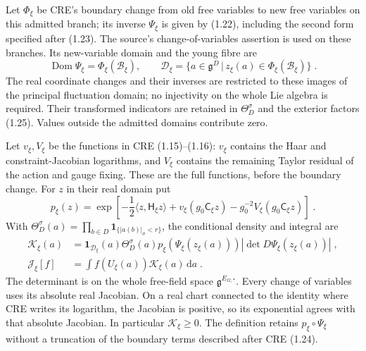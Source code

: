 \documentclass[11pt]{article}
\newcommand{\dd}{\mathrm{d}}
\begin{document}
Let $\Phi_\xi$ be CRE's boundary change from old free variables to new free variables on this admitted branch; its inverse $\Psi_\xi$ is given by (1.22), including the second form specified after (1.23). The source's change-of-variables assertion is used on these branches. Its new-variable domain and the young fibre are
\begin{equation}\label{eq:retained-change-domain}
    \operatorname{Dom}\Psi_\xi=\Phi_\xi(\mathcal B_\xi),
    \qquad \mathcal D_\xi=
        \bigl\{a\in\mathfrak g^D\, | \,z_\xi(a)\in\Phi_\xi(\mathcal B_\xi)\bigr\}\;.
\end{equation}
The real coordinate changes and their inverses are restricted to these images of the principal fluctuation domain; no injectivity on the whole Lie algebra is required. Their transformed indicators are retained in $\Theta_D^\sigma$ and the exterior factors (1.25). Values outside the admitted domains contribute zero.

Let $v_\xi,V_\xi$ be the functions in CRE (1.15)--(1.16): $v_\xi$ contains the Haar and constraint-Jacobian logarithms, and $V_\xi$ contains the remaining Taylor residual of the action and gauge fixing. These are the full functions, before the boundary change. For $z$ in their real domain put
\begin{equation}\label{eq:retained-prechange-density}
    p_\xi(z)=\exp\left[
        -\frac{1}{2}\langle z,\mathsf H_\xi z\rangle
        +v_\xi(g_0\mathsf C_\xi z)
        -g_0^{-2}V_\xi(g_0\mathsf C_\xi z)\right]\;.
\end{equation}
With $\Theta_D^\sigma(a)=\prod_{b\in D}\mathbf1_{\{|a(b)|_\sigma<r\}}$, the conditional density and integral are
\begin{equation}\label{eq:retained-positive-kernel}
    \begin{aligned}
        \mathcal K_\xi(a)&=
            \mathbf1_{\mathcal D_\xi}(a)\Theta_D^\sigma(a)
            p_\xi(\Psi_\xi(z_\xi(a)))
            |\det D\Psi_\xi(z_\xi(a))|\;,\\
        \mathcal J_\xi[f]&=\int
            f(U_\xi(a))\mathcal K_\xi(a)\,\dd a\;.
    \end{aligned}
\end{equation}
The determinant is on the whole free-field space $\mathfrak g^{E_{\Omega,*}}$. Every change of variables uses its absolute real Jacobian. On a real chart connected to the identity where CRE writes its logarithm, the Jacobian is positive, so its exponential agrees with that absolute Jacobian. In particular $\mathcal K_\xi\geq0$. The definition retains $p_\xi\circ\Psi_\xi$ without a truncation of the boundary terms described after CRE (1.24).
\end{document}
